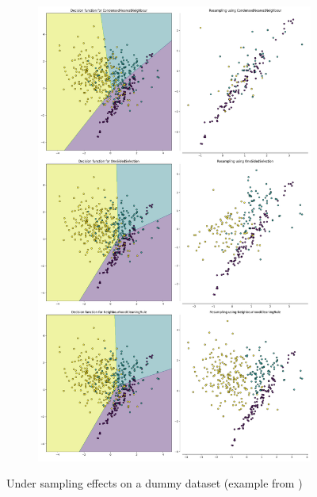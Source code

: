 \begin{figure}[H]
	\begin{subfigure}{0.5\textwidth}
		\centering
		\includegraphics[scale=0.2]{./src/under_sampling_ex2.png}
	\end{subfigure}
	\caption{Under sampling effects on a dummy dataset (example from \cite{imblearn})}
	\label{under_sampling_ex}
\end{figure}

